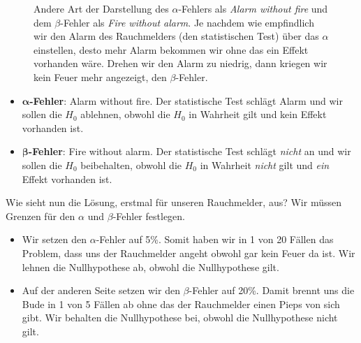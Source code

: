 \documentclass[
  letterpaper,
]{scrbook}
\providecommand{\tightlist}{%
  \setlength{\itemsep}{0pt}\setlength{\parskip}{0pt}}\usepackage{longtable,booktabs,array}
\begin{document}
\begin{tcolorbox}
\begin{figure}
{}

\caption{\label{fig-teststatistik-05}Andere Art der Darstellung des
\(\alpha\)-Fehlers als \emph{Alarm without fire} und dem
\(\beta\)-Fehler als \emph{Fire without alarm}. Je nachdem wie
empfindlich wir den Alarm des Rauchmelders (den statistischen Test) über
das \(\alpha\) einstellen, desto mehr Alarm bekommen wir ohne das ein
Effekt vorhanden wäre. Drehen wir den Alarm zu niedrig, dann kriegen wir
kein Feuer mehr angezeigt, den \(\beta\)-Fehler.}

\end{figure}

\begin{itemize}
\tightlist
\item
  \(\boldsymbol{\alpha}\)\textbf{-Fehler}: Alarm without fire. Der
  statistische Test schlägt Alarm und wir sollen die \(H_0\) ablehnen,
  obwohl die \(H_0\) in Wahrheit gilt und kein Effekt vorhanden ist.
\item
  \(\boldsymbol{\beta}\)\textbf{-Fehler}: Fire without alarm. Der
  statistische Test schlägt \emph{nicht} an und wir sollen die \(H_0\)
  beibehalten, obwohl die \(H_0\) in Wahrheit \emph{nicht} gilt und
  \emph{ein} Effekt vorhanden ist.
\end{itemize}

\end{tcolorbox}

Wie sieht nun die Lösung, erstmal für unseren Rauchmelder, aus? Wir
müssen Grenzen für den \(\alpha\) und \(\beta\)-Fehler festlegen.

{}

\begin{itemize}
\tightlist
\item
  Wir setzen den \(\alpha\)-Fehler auf 5\%. Somit haben wir in 1 von 20
  Fällen das Problem, dass uns der Rauchmelder angeht obwohl gar kein
  Feuer da ist. Wir lehnen die Nullhypothese ab, obwohl die
  Nullhypothese gilt.
\end{itemize}

{}

\begin{itemize}
\tightlist
\item
  Auf der anderen Seite setzen wir den \(\beta\)-Fehler auf 20\%. Damit
  brennt uns die Bude in 1 von 5 Fällen ab ohne das der Rauchmelder
  einen Pieps von sich gibt. Wir behalten die Nullhypothese bei, obwohl
  die Nullhypothese nicht gilt.
\end{itemize}
\end{document}
